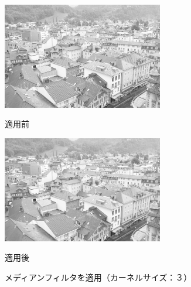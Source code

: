 \documentclass{jsarticle}
\begin{document}
\begin{figure}[htbp]
 \begin{minipage}{0.5\hsize}
  \begin{center}
   \includegraphics[width=70mm]{town.png}
  \end{center}
  \caption{適用前}
  \label{fig:one}
 \end{minipage}
 \begin{minipage}{0.5\hsize}
  \begin{center}
   \includegraphics[width=70mm]{output_median_3.png}
  \end{center}
  \caption{適用後}
  \label{fig:two}
 \end{minipage}
 \caption{メディアンフィルタを適用（カーネルサイズ：３）}
\end{figure}
\end{document}
